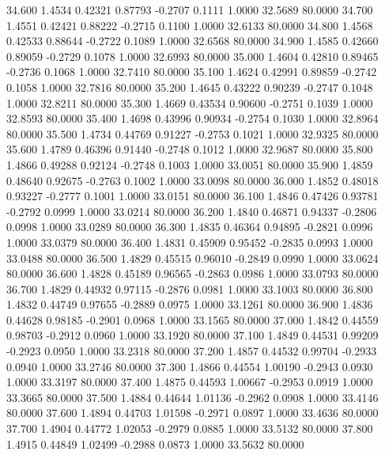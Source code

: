   34.600   1.4534   0.42321   0.87793  -0.2707   0.1111   1.0000  32.5689  80.0000
  34.700   1.4551   0.42421   0.88222  -0.2715   0.1100   1.0000  32.6133  80.0000
  34.800   1.4568   0.42533   0.88644  -0.2722   0.1089   1.0000  32.6568  80.0000
  34.900   1.4585   0.42660   0.89059  -0.2729   0.1078   1.0000  32.6993  80.0000
  35.000   1.4604   0.42810   0.89465  -0.2736   0.1068   1.0000  32.7410  80.0000
  35.100   1.4624   0.42991   0.89859  -0.2742   0.1058   1.0000  32.7816  80.0000
  35.200   1.4645   0.43222   0.90239  -0.2747   0.1048   1.0000  32.8211  80.0000
  35.300   1.4669   0.43534   0.90600  -0.2751   0.1039   1.0000  32.8593  80.0000
  35.400   1.4698   0.43996   0.90934  -0.2754   0.1030   1.0000  32.8964  80.0000
  35.500   1.4734   0.44769   0.91227  -0.2753   0.1021   1.0000  32.9325  80.0000
  35.600   1.4789   0.46396   0.91440  -0.2748   0.1012   1.0000  32.9687  80.0000
  35.800   1.4866   0.49288   0.92124  -0.2748   0.1003   1.0000  33.0051  80.0000
  35.900   1.4859   0.48640   0.92675  -0.2763   0.1002   1.0000  33.0098  80.0000
  36.000   1.4852   0.48018   0.93227  -0.2777   0.1001   1.0000  33.0151  80.0000
  36.100   1.4846   0.47426   0.93781  -0.2792   0.0999   1.0000  33.0214  80.0000
  36.200   1.4840   0.46871   0.94337  -0.2806   0.0998   1.0000  33.0289  80.0000
  36.300   1.4835   0.46364   0.94895  -0.2821   0.0996   1.0000  33.0379  80.0000
  36.400   1.4831   0.45909   0.95452  -0.2835   0.0993   1.0000  33.0488  80.0000
  36.500   1.4829   0.45515   0.96010  -0.2849   0.0990   1.0000  33.0624  80.0000
  36.600   1.4828   0.45189   0.96565  -0.2863   0.0986   1.0000  33.0793  80.0000
  36.700   1.4829   0.44932   0.97115  -0.2876   0.0981   1.0000  33.1003  80.0000
  36.800   1.4832   0.44749   0.97655  -0.2889   0.0975   1.0000  33.1261  80.0000
  36.900   1.4836   0.44628   0.98185  -0.2901   0.0968   1.0000  33.1565  80.0000
  37.000   1.4842   0.44559   0.98703  -0.2912   0.0960   1.0000  33.1920  80.0000
  37.100   1.4849   0.44531   0.99209  -0.2923   0.0950   1.0000  33.2318  80.0000
  37.200   1.4857   0.44532   0.99704  -0.2933   0.0940   1.0000  33.2746  80.0000
  37.300   1.4866   0.44554   1.00190  -0.2943   0.0930   1.0000  33.3197  80.0000
  37.400   1.4875   0.44593   1.00667  -0.2953   0.0919   1.0000  33.3665  80.0000
  37.500   1.4884   0.44644   1.01136  -0.2962   0.0908   1.0000  33.4146  80.0000
  37.600   1.4894   0.44703   1.01598  -0.2971   0.0897   1.0000  33.4636  80.0000
  37.700   1.4904   0.44772   1.02053  -0.2979   0.0885   1.0000  33.5132  80.0000
  37.800   1.4915   0.44849   1.02499  -0.2988   0.0873   1.0000  33.5632  80.0000
